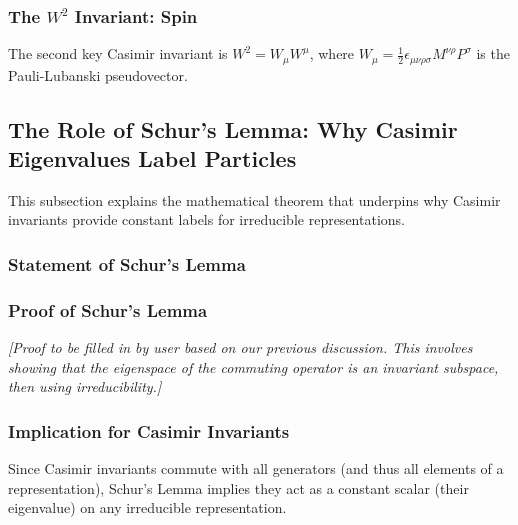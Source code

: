 \documentclass{amsart}
\theoremstyle{definition}
\theoremstyle{remark}
\begin{document}
\subsubsection{The $W^2$ Invariant: Spin}
\label{subsubsec:w_squared_invariant}
The second key Casimir invariant is $W^2 = W_\mu W^\mu$, where $W_\mu = \frac{1}{2} \epsilon_{\mu\nu\rho\sigma} M^{\nu\rho} P^\sigma$ is the Pauli-Lubanski pseudovector.

\subsection{The Role of Schur's Lemma: Why Casimir Eigenvalues Label Particles}
\label{subsec:schurs_lemma_role}
This subsection explains the mathematical theorem that underpins why Casimir invariants provide constant labels for irreducible representations.

\subsubsection{Statement of Schur's Lemma}
\label{subsubsec:schurs_lemma_statement}

\subsubsection{Proof of Schur's Lemma}
\label{subsubsec:schurs_lemma_proof}
\textit{[Proof to be filled in by user based on our previous discussion. This involves showing that the eigenspace of the commuting operator is an invariant subspace, then using irreducibility.]}

\subsubsection{Implication for Casimir Invariants}
\label{subsubsec:schur_implication_casimir}
Since Casimir invariants commute with all generators (and thus all elements of a representation), Schur's Lemma implies they act as a constant scalar (their eigenvalue) on any irreducible representation.
\end{document}
